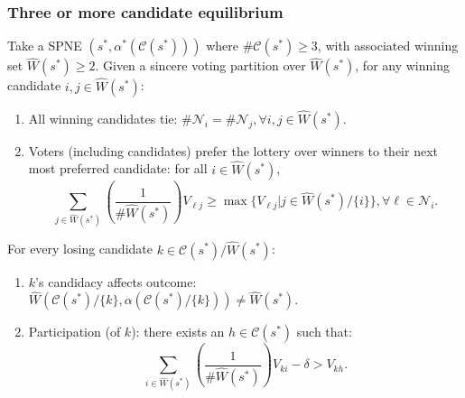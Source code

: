 \documentclass[11pt,aspectratio=169]{beamer}
\begin{document}
\begin{frame}
\frametitle{Three or more candidate equilibrium}

\begin{footnotesize}

Take a SPNE $(s^*, \alpha^*(\mathcal{C}(s^*)))$ where $\#\mathcal{C}(s^*)\geq 3$, with associated winning set $\hat{W}(s^*)\geq 2$. Given a sincere voting partition over $\hat{W}(s^*)$, for any winning candidate $i,j\in \hat{W}(s^*)$:  \begin{enumerate}
\item All winning candidates tie: $\#\mathcal{N}_i = \#\mathcal{N}_j, \forall i, j \in \hat{W}(s^*)$.
\item Voters (including candidates) prefer the lottery over winners to their next most preferred candidate: for all $i \in \hat{W}(s^*)$,\vspace{-8pt} $$\sum_{j\in \hat{W}(s^*)} \left( \frac{1}{\#\hat{W}(s^*)}\right) V_{\ell j} \geq \max \bigg\{ V_{\ell j} \bigg| j \in \hat{W}(s^*)/\{i\} \bigg\}, \forall \ell \in \mathcal{N}_i.$$ 
\end{enumerate} For every losing candidate $k\in \mathcal{C}(s^*)/\hat{W}(s^*)$: \begin{enumerate}
\item $k$'s candidacy affects outcome: $\hat{W}(\mathcal{C}(s^*)/\{k\}, \alpha(\mathcal{C}(s^*)/\{k\})) \neq \hat{W}(s^*)$. 
\item Participation (of $k$): there exists an $h \in \mathcal{C}(s^*)$ such that: $$\sum_{i\in \hat{W}(s^*)} \left( \frac{1}{\#\hat{W}(s^*)}\right) V_{ki} - \delta > V_{kh}.$$
\end{enumerate}

\end{footnotesize}


\end{frame}
\end{document}
